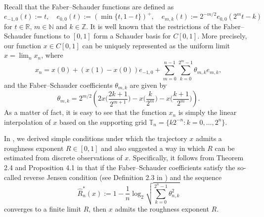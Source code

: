 \documentclass[12pt,reqno]{article}
\def\wh{\widehat}
\numberwithin{equation}{section}
\theoremstyle{definition}
\def\wh{\widehat}
\newcommand{\bR}{\mathbb{R}}
\newcommand{\bN}{\mathbb{N}}
\newcommand{\bT}{\mathbb{T}}
\newcommand{\bZ}{\mathbb{Z}}
\begin{document}
Recall that the Faber--Schauder functions are defined as 
	\begin{equation*}
		e_{-1,0}(t):= t, \quad e_{0,0}(t):= (\min\{t,1-t\})^{+}, \quad e_{m,k}(t):= 2^{-m/2}e_{0,0}(2^mt-k)
	\end{equation*}
	for $t \in \bR$, $m \in \bN$ and $k \in \bZ$. It is well known that the restrictions of the Faber--Schauder functions to $[0,1]$ form a Schauder basis for $C[0,1]$. More precisely, our function $x \in C[0,1]$ can be uniquely represented as the uniform limit $x=\lim_nx_n$, where 
	\begin{equation}\label{eq_Faber_expansion}
		x_n= x(0)+\left(x(1)-x(0)\right)e_{-1,0} + \sum_{m = 0}^{n-1}\sum_{k = 0}^{2^m-1}\theta_{m,k}e_{m,k},
	\end{equation}
	and the Faber--Schauder coefficients $\theta_{m,k}$ are given by 
	\begin{equation}\label{Faber--Schauder eq}
		\theta_{m,k} = 2^{m/2}\left(2x\Big(\frac{2k+1}{2^{m+1}}\Big)-x\Big(\frac{k}{2^m}\Big)-x\Big(\frac{k+1}{2^m}\Big)\right).
	\end{equation}
	As a matter of fact, it is easy to see that the function $x_n$ is simply the linear interpolation of $x$ based on the supporting grid $\bT_n=\{k2^{-n}:k=0,\dots, 2^n\}$.


 In \cite{HanSchiedHurst}, we derived simple conditions under which the trajectory $x$ admits a roughness exponent ${R}\in[0,1]$ and also suggested a way in which ${R}$ can be estimated from discrete observations of $x$. Specifically, it follows from Theorem 2.4 and Proposition 4.1 in \cite{HanSchiedHurst} that if the Faber--Schauder coefficients satisfy the so-called reverse Jensen condition (see Definition 2.3 in \cite{HanSchiedHurst}) and the sequence
\begin{equation}\label{cH eq}
\wh R^*_n(x):=1-\frac1{n}\log_2\sqrt{\sum_{k=0}^{2^n-1}\theta_{n,k}^2}
\end{equation}
converges to a finite limit $R$, then $x$ admits the roughness exponent $R$.
\end{document}
